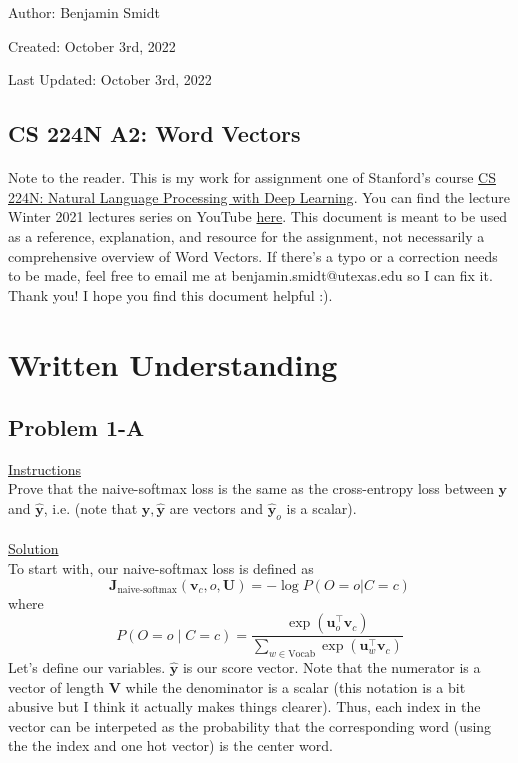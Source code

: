 \documentclass[12pt]{article}
\begin{document}
\noindent Author: Benjamin Smidt

\noindent Created: October 3rd, 2022

\noindent Last Updated: October 3rd, 2022
\begin{center}
\section*{CS 224N A2: Word Vectors}
\end{center}

\paragraph{} Note to the reader. This is my work for assignment one of Stanford's course
\href{https://web.stanford.edu/class/cs224n/}{CS 224N: Natural Language Processing with Deep Learning}. 
You can find the lecture Winter 2021 lectures series on YouTube \href{https://www.youtube.com/playlist?list=PLoROMvodv4rOSH4v6133s9LFPRHjEmbmJ}{here}.
This document is meant to be used as a reference, explanation, and resource for the assignment, 
not necessarily a comprehensive overview of Word Vectors. If there's a typo or a correction 
needs to be made, feel free to email me at benjamin.smidt@utexas.edu so I can fix it. 
Thank you! I hope you find this document helpful :). 

\tableofcontents{}

\section{Written Understanding}

\subsection{Problem 1-A}
\underline{Instructions}
~\\
Prove that the naive-softmax loss is the same as the cross-entropy 
loss between $\bm y$ and $\hat{\bm y}$, i.e. (note that $\bm y, \hat{\bm y}$ 
are vectors and $\hat{\bm y}_o$ is a scalar).
~\\
~\\
\underline{Solution}
~\\
To start with, our naive-softmax loss is defined as
\begin{equation*}
    \bm J_{\text{naive-softmax}}(\bm v_c, o, \bm U) = -\log P(O=o| C=c)
\end{equation*}
where 
\begin{equation*}
P(O=o \mid C=c) = \frac{\exp(\bm u_{o}^\top \bm v_c)}{\sum_{w \in \text{Vocab}} \exp(\bm u_{w}^\top \bm v_c)}
\end{equation*}
Let's define our variables. $ \hat{\bm y}$ is our score vector. Note that the 
numerator is a vector of length $\bm V$ while the denominator is a scalar (this notation 
is a bit abusive but I think it actually makes things clearer). Thus, each index 
in the vector can be interpeted as the probability that the corresponding word (using the 
the index and one hot vector) is the center word. 
\end{document}
